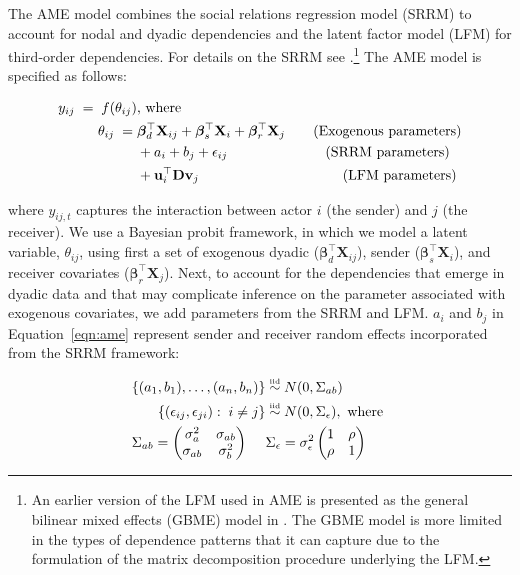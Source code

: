 The AME model combines the social relations regression model (SRRM) to account for nodal and dyadic dependencies and the latent factor model (LFM) for third-order dependencies.  For details on the SRRM see \citet{li:loken:2002,hoff:2005,dorff:minhas:2017}.\footnote{An earlier version of the LFM  used in AME is presented as the general bilinear mixed effects (GBME) model in \citet{hoff:ward:2004}. The GBME model is more limited in the types of dependence patterns that it can capture due to the formulation of the matrix decomposition procedure underlying the LFM.} The AME model is specified as follows:

\begin{align}
	\begin{aligned}
		y_{ij} \;=\; f(\theta_{ij}) &\text{, where } \\
		\theta_{ij} \;=\;& \bm\beta_{d}^{\top} \mathbf{X}_{ij} + \bm\beta_{s}^{\top} \mathbf{X}_{i} + \bm\beta_{r}^{\top} \mathbf{X}_{j} \text{\qquad(Exogenous parameters)} \\
		& + a_{i} + b_{j} + \epsilon_{ij} \text{\qquad\qquad\qquad\quad(SRRM parameters)} \\
		& + \mathbf{u}_{i}^{\top} \mathbf{D} \mathbf{v}_{j}  \text{\qquad\qquad\qquad\qquad\qquad\;(LFM parameters)} \\ 
	\label{eqn:ame}
	\end{aligned}
\end{align}

where $y_{ij,t}$ captures the interaction between actor $i$ (the sender) and $j$ (the receiver). We use a Bayesian probit framework, in which we model a latent variable, $\theta_{ij}$, using first a set of exogenous dyadic ($\bm\beta_{d}^{\top} \mathbf{X}_{ij}$), sender ($\bm\beta_{s}^{\top} \mathbf{X}_{i}$), and receiver covariates ($\bm\beta_{r}^{\top} \mathbf{X}_{j}$). Next, to account for the dependencies that emerge in dyadic data and that may complicate inference on the parameter associated with exogenous covariates, we add parameters from the SRRM and LFM. $a_{i}$ and $b_{j}$ in Equation~\ref{eqn:ame} represent sender and receiver random effects incorporated from the SRRM framework:

\begin{align}
	\begin{aligned}
		\{ (a_{1}, b_{1}), \ldots, (a_{n}, b_{n}) \} &\simiid N(0,\Sigma_{ab}) \\ 
		\{ (\epsilon_{ij}, \epsilon_{ji}) : \; i \neq j\} &\simiid N(0,\Sigma_{\epsilon}), \text{ where } \\
		\Sigma_{ab} = \begin{pmatrix} \sigma_{a}^{2} & \sigma_{ab} \\ \sigma_{ab} & \sigma_{b}^2   \end{pmatrix} \;\;\;\;\; &\Sigma_{\epsilon} = \sigma_{\epsilon}^{2} \begin{pmatrix} 1 & \rho \\ \rho & 1  \end{pmatrix}
	\label{eqn:srm}
	\end{aligned}
\end{align}

